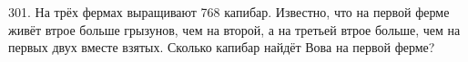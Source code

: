 301. На трёх фермах выращивают 768 капибар. Известно, что на первой ферме живёт втрое больше грызунов, чем на второй, а на третьей втрое больше, чем на первых двух вместе взятых. Сколько капибар найдёт Вова на первой ферме?\\
